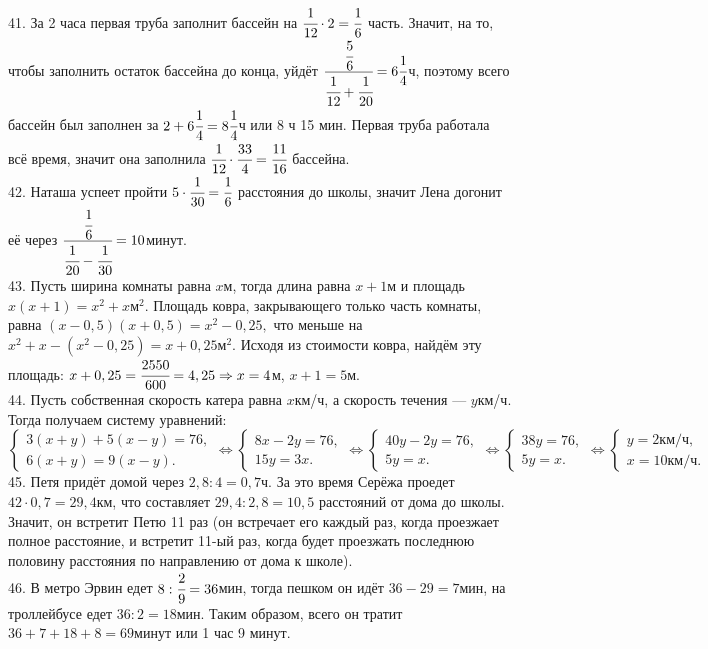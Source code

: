 41. За 2 часа первая труба заполнит бассейн на $\cfrac{1}{12}\cdot2=\cfrac{1}{6}$ часть. Значит, на то, чтобы заполнить остаток бассейна до конца, уйдёт $\cfrac{\cfrac{5}{6}}{\cfrac{1}{12}+\cfrac{1}{20}}=6\cfrac{1}{4}$ч, поэтому всего бассейн был заполнен за $2+6\cfrac{1}{4}=8\cfrac{1}{4}$ч или 8 ч 15 мин. Первая труба работала всё время, значит она заполнила $\cfrac{1}{12}\cdot\cfrac{33}{4}=\cfrac{11}{16}$ бассейна.\\
42. Наташа успеет пройти $5\cdot\cfrac{1}{30}=\cfrac{1}{6}$ расстояния до школы, значит Лена догонит её через $\cfrac{\cfrac{1}{6}}{\cfrac{1}{20}-\cfrac{1}{30}}=10$минут.\\
43. Пусть ширина комнаты равна $x$м, тогда длина равна $x+1$м и площадь $x(x+1)=x^2+x\text{м}^2.$ Площадь ковра, закрывающего только часть комнаты, равна $(x-0,5)(x+0,5)=x^2-0,25,$ что меньше на $x^2+x-(x^2-0,25)=x+0,25\text{м}^2.$ Исходя из стоимости ковра, найдём эту площадь: $x+0,25=\cfrac{2550}{600}=4,25\Rightarrow x=4$м, $x+1=5$м.\\
44. Пусть собственная скорость катера равна $x$км/ч, а скорость течения --- $y$км/ч. Тогда получаем систему уравнений: $\begin{cases}3(x+y)+5(x-y)=76,\\
6(x+y)=9(x-y).\end{cases}\Leftrightarrow\begin{cases}8x-2y=76,\\
15y=3x.\end{cases}\Leftrightarrow\begin{cases}40y-2y=76,\\
5y=x.\end{cases}\Leftrightarrow\begin{cases}38y=76,\\
5y=x.\end{cases}\Leftrightarrow\begin{cases} y=2\text{км/ч},\\
x=10\text{км/ч}.\end{cases}$\\
45. Петя придёт домой через $2,8:4=0,7$ч. За это время Серёжа проедет $42\cdot0,7=29,4$км, что составляет $29,4:2,8=10,5$ расстояний от дома до школы. Значит, он встретит Петю 11 раз (он встречает его каждый раз, когда проезжает полное расстояние, и встретит 11-ый раз, когда будет проезжать последнюю половину расстояния по направлению от дома к школе).\\
46. В метро Эрвин едет $8:\cfrac{2}{9}=36$мин, тогда пешком он идёт $36-29=7$мин, на троллейбусе едет $36:2=18$мин. Таким образом, всего он тратит $36+7+18+8=69$минут или 1 час 9 минут.\\
